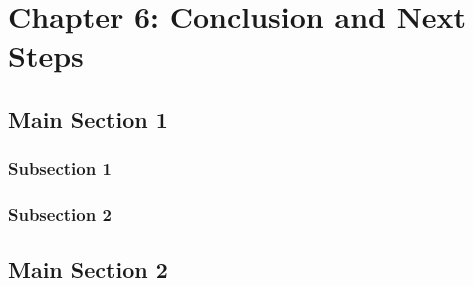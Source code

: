 \chapter{Chapter 6: Conclusion and Next Steps} 
\label{Chapter6}

\section{Main Section 1}

\subsection{Subsection 1}

\subsection{Subsection 2}


\section{Main Section 2}
